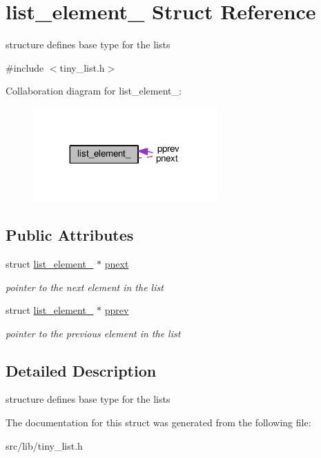 \hypertarget{structlist__element__}{}\section{list\+\_\+element\+\_\+ Struct Reference}
\label{structlist__element__}


structure defines base type for the lists  




{\ttfamily \#include $<$tiny\+\_\+list.\+h$>$}



Collaboration diagram for list\+\_\+element\+\_\+\+:\nopagebreak
\begin{figure}[H]
\begin{center}
\leavevmode
\includegraphics[width=200pt]{structlist__element____coll__graph}
\end{center}
\end{figure}
\subsection*{Public Attributes}
\begin{DoxyCompactItemize}
\item 
\hypertarget{structlist__element___a81cb2c54606be8120460bded0d919039}{}struct \hyperlink{structlist__element__}{list\+\_\+element\+\_\+} $\ast$ \hyperlink{structlist__element___a81cb2c54606be8120460bded0d919039}{pnext}\label{structlist__element___a81cb2c54606be8120460bded0d919039}

\begin{DoxyCompactList}\small\item\em pointer to the next element in the list \end{DoxyCompactList}\item 
\hypertarget{structlist__element___a0f6c573966c9d70d4a2ef19b73717515}{}struct \hyperlink{structlist__element__}{list\+\_\+element\+\_\+} $\ast$ \hyperlink{structlist__element___a0f6c573966c9d70d4a2ef19b73717515}{pprev}\label{structlist__element___a0f6c573966c9d70d4a2ef19b73717515}

\begin{DoxyCompactList}\small\item\em pointer to the previous element in the list \end{DoxyCompactList}\end{DoxyCompactItemize}


\subsection{Detailed Description}
structure defines base type for the lists 

The documentation for this struct was generated from the following file\+:\begin{DoxyCompactItemize}
\item 
src/lib/tiny\+\_\+list.\+h\end{DoxyCompactItemize}
